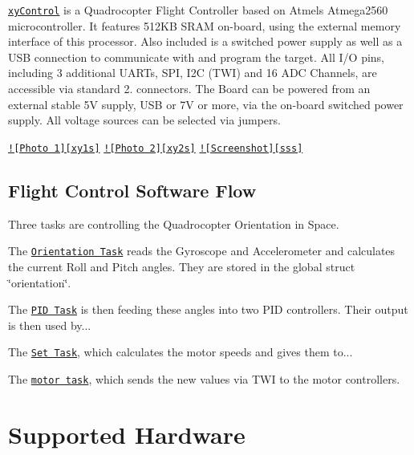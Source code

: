

\href{http://www.xythobuz.de/xycontrol/}{\tt xy\-Control} is a Quadrocopter Flight Controller based on Atmels Atmega2560 microcontroller. It features 512\-K\-B S\-R\-A\-M on-\/board, using the external memory interface of this processor. Also included is a switched power supply as well as a U\-S\-B connection to communicate with and program the target. All I/\-O pins, including 3 additional U\-A\-R\-Ts, S\-P\-I, I2\-C (T\-W\-I) and 16 A\-D\-C Channels, are accessible via standard 2.\-54mm connectors. The Board can be powered from an external stable 5\-V supply, U\-S\-B or 7\-V or more, via the on-\/board switched power supply. All voltage sources can be selected via jumpers.

\href{http://www.xythobuz.de/img/xycontrol1.jpg}{\tt !\mbox{[}Photo 1\mbox{]}\mbox{[}xy1s\mbox{]}} \href{http://www.xythobuz.de/img/xycontrol2.jpg}{\tt !\mbox{[}Photo 2\mbox{]}\mbox{[}xy2s\mbox{]}} \href{http://www.xythobuz.de/img/xyCopterOsci.png}{\tt !\mbox{[}Screenshot\mbox{]}\mbox{[}sss\mbox{]}}

\subsection*{Flight Control Software Flow}

Three tasks are controlling the Quadrocopter Orientation in Space.


\begin{DoxyItemize}
\item The \href{https://github.com/xythobuz/xyControl/blob/master/include/orientation.h}{\tt Orientation Task} reads the Gyroscope and Accelerometer and calculates the current Roll and Pitch angles. They are stored in the global struct \char`\"{}orientation\char`\"{}.
\item The \href{https://github.com/xythobuz/xyControl/blob/master/include/pid.h}{\tt P\-I\-D Task} is then feeding these angles into two P\-I\-D controllers. Their output is then used by...
\item The \href{https://github.com/xythobuz/xyControl/blob/master/include/set.h}{\tt Set Task}, which calculates the motor speeds and gives them to...
\item The \href{https://github.com/xythobuz/xyControl/blob/master/include/motor.h}{\tt motor task}, which sends the new values via T\-W\-I to the motor controllers.
\end{DoxyItemize}

\section*{Supported Hardware}


